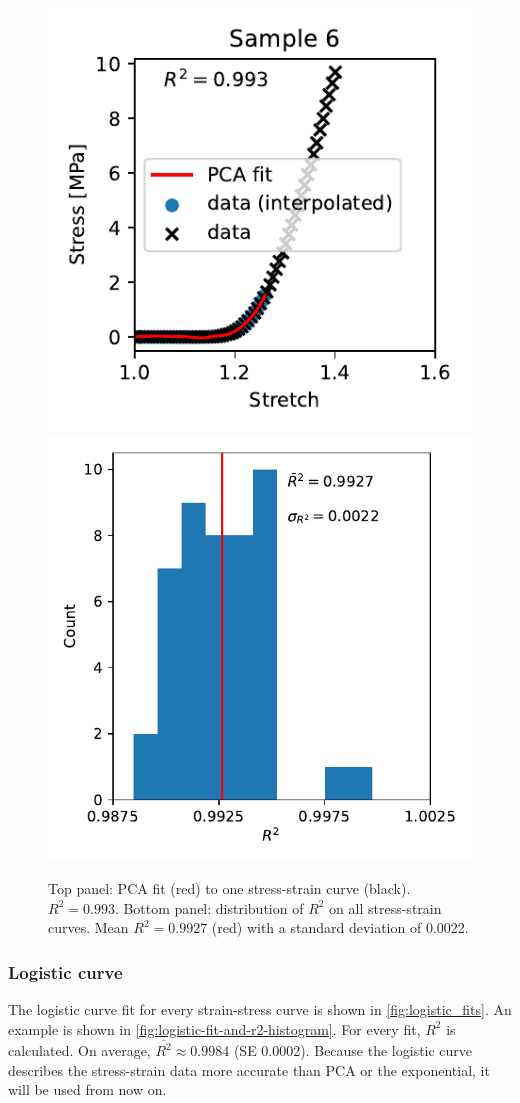 \begin{figure}
    \centering
    \includegraphics[width=0.45\linewidth]{skinstression/images/pca-fits/sample_6.pdf}
    \includegraphics[width=0.45\linewidth]{skinstression/images/pca-fits/r2_hist.pdf}
    \caption[Logistic curve fits to stress-strain curves]{
        Top panel: PCA fit (red) to one stress-strain curve (black).
        $R^2 = 0.993$.
        Bottom panel: distribution of $R^2$ on all stress-strain curves.
        Mean $R^2 = 0.9927$ (red) with a standard deviation of \num{0.0022}.
    }
    \label{fig:pca-fit-and-r2-histogram}
\end{figure}


\subsubsection{Logistic curve}
The logistic curve fit for every strain-stress curve is shown in \cref{fig:logistic_fits}.
An example is shown in \cref{fig:logistic-fit-and-r2-histogram}.
For every fit, $R^2$ is calculated.
On average, $\overline{R^2} \approx \num{0.9984}$ (SE \num{0.0002}).
Because the logistic curve describes the stress-strain data more accurate than PCA or the exponential, it will be used from now on.

